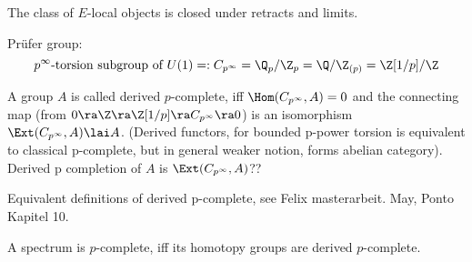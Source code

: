 \begin{lem}
The class of $E$-local objects is closed under retracts and limits.
\end{lem}

\begin{lem}
Prüfer group: \begin{equation*}
    p^\infty\text{-torsion subgroup of } U(1) =:C_{p^\infty}=\Q_p/\Z_p=\Q/\Z_{(p)}=\Z[1/p]/\Z
\end{equation*}
\end{lem}
\begin{defn}
A group $A$ is called derived $p$-complete, iff $\Hom(C_{p^\infty},A)=0$ and the connecting map (from $0\ra \Z\ra \Z[1/p]\ra C_{p^\infty}\ra 0$) is an isomorphism $\Ext(C_{p^\infty},A)\lai A$. 
(Derived functors, for bounded p-power torsion is equivalent to classical p-complete, but in general weaker notion, forms abelian category).
\newline
Derived p completion of $A$ is $\Ext(C_{p^\infty},A)$??
\end{defn}
\begin{lem}
Equivalent definitions of derived p-complete, see Felix masterarbeit. May, Ponto Kapitel 10.
\end{lem}
\begin{thm}
A spectrum is $p$-complete, iff its homotopy groups are derived $p$-complete. 
\end{thm}
